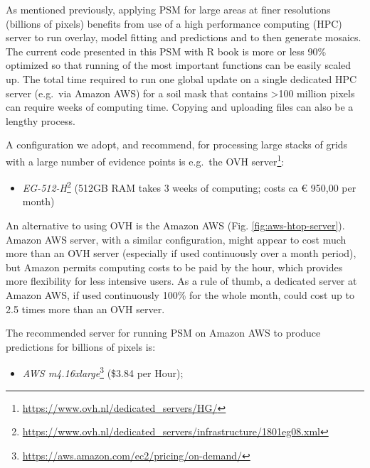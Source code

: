 \documentclass[graybox,natbib,nospthms,UStrade]{svmono}
\providecommand{\tightlist}{%
  \setlength{\itemsep}{0pt}\setlength{\parskip}{0pt}}
\providecommand{\tightlist}{\setlength{\itemsep}{0pt}\setlength{\parskip}{0pt}}
\renewcommand{\href}[2]{#2 (\url{#1})}
\renewcommand{\href}[2]{#2\footnote{\url{#1}}}
\begin{document}
As mentioned previously, applying PSM for large areas at finer
resolutions (billions of pixels) benefits from use of a high performance
computing (HPC) server to run overlay, model fitting and predictions and
to then generate mosaics. The current code presented in this PSM with R
book is more or less 90\% optimized so that running of the most important
functions can be easily scaled up. The total time required to run one
global update on a single dedicated HPC server (e.g.~via Amazon AWS) for a
soil mask that contains \textgreater{}100 million pixels can
require weeks of computing time. Copying and uploading files can also be
a lengthy process.

A configuration we adopt, and recommend, for processing large stacks of
grids with a large number of evidence points is e.g.~the \href{https://www.ovh.nl/dedicated_servers/HG/}{OVH server}:

\begin{itemize}
\tightlist
\item
  \href{https://www.ovh.nl/dedicated_servers/infrastructure/1801eg08.xml}{\emph{EG-512-H}}
  (512GB RAM takes 3 weeks of computing; costs ca € 950,00
  per month)
\end{itemize}

An alternative to using OVH is the Amazon AWS (Fig. \ref{fig:aws-htop-server}).
Amazon AWS server, with a similar configuration, might appear to cost much more than an OVH server
(especially if used continuously over a month period), but Amazon permits
computing costs to be paid by the hour, which provides more flexibility
for less intensive users. As a rule of thumb, a dedicated server at
Amazon AWS, if used continuously 100\% for the whole month, could cost
up to 2.5 times more than an OVH server.

The recommended server for running PSM on Amazon AWS to produce predictions for billions of pixels is:

\begin{itemize}
\tightlist
\item
  \href{https://aws.amazon.com/ec2/pricing/on-demand/}{\emph{AWS m4.16xlarge}}
  (\$3.84 per Hour);
\end{itemize}
\end{document}
